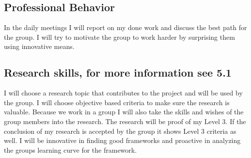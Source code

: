 \subsection{Professional Behavior}
In the daily meetings I will report on my done work and discuss the best path for the group. I will try to motivate the group to work harder by surprising them using innovative means.

\subsection{Research skills, for more information see 5.1}
I will choose a research topic that contributes to the project and will be used by the group. I will choose objective based criteria to make sure the research is valuable. Because we work in a group I will also take the skills and wishes of the group members into the research. The research will be proof of my Level 3. If the conclusion of my research is accepted by the group it shows Level 3 criteria as well. I will be innovative in finding good frameworks and proactive in analyzing the groups learning curve for the framework.
